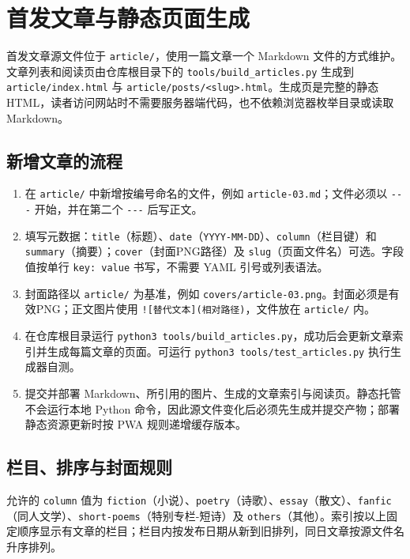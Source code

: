\documentclass[fontset=fandol]{ctexrep}
\begin{document}
\section{首发文章与静态页面生成}

首发文章源文件位于 \verb|article/|，使用一篇文章一个 Markdown 文件的方式维护。文章列表和阅读页由仓库根目录下的 \verb|tools/build_articles.py| 生成到 \verb|article/index.html| 与 \verb|article/posts/<slug>.html|。生成页是完整的静态 HTML，读者访问网站时不需要服务器端代码，也不依赖浏览器枚举目录或读取 Markdown。

\subsection{新增文章的流程}

\begin{enumerate}
	\item 在 \verb|article/| 中新增按编号命名的文件，例如 \verb|article-03.md|；文件必须以 \verb|---| 开始，并在第二个 \verb|---| 后写正文。
	\item 填写元数据：\verb|title|（标题）、\verb|date|（\verb|YYYY-MM-DD|）、\verb|column|（栏目键）和 \verb|summary|（摘要）；\verb|cover|（封面PNG路径）及 \verb|slug|（页面文件名）可选。字段值按单行 \verb|key: value| 书写，不需要 YAML 引号或列表语法。
	\item 封面路径以 \verb|article/| 为基准，例如 \verb|covers/article-03.png|。封面必须是有效PNG；正文图片使用 \verb|![替代文本](相对路径)|，文件放在 \verb|article/| 内。
	\item 在仓库根目录运行 \verb|python3 tools/build_articles.py|，成功后会更新文章索引并生成每篇文章的页面。可运行 \verb|python3 tools/test_articles.py| 执行生成器自测。
	\item 提交并部署 Markdown、所引用的图片、生成的文章索引与阅读页。静态托管不会运行本地 Python 命令，因此源文件变化后必须先生成并提交产物；部署静态资源更新时按 PWA 规则递增缓存版本。
\end{enumerate}

\subsection{栏目、排序与封面规则}

允许的 \verb|column| 值为 \verb|fiction|（小说）、\verb|poetry|（诗歌）、\verb|essay|（散文）、\verb|fanfic|（同人文学）、\verb|short-poems|（特别专栏-短诗）及 \verb|others|（其他）。索引按以上固定顺序显示有文章的栏目；栏目内按发布日期从新到旧排列，同日文章按源文件名升序排列。
\end{document}
